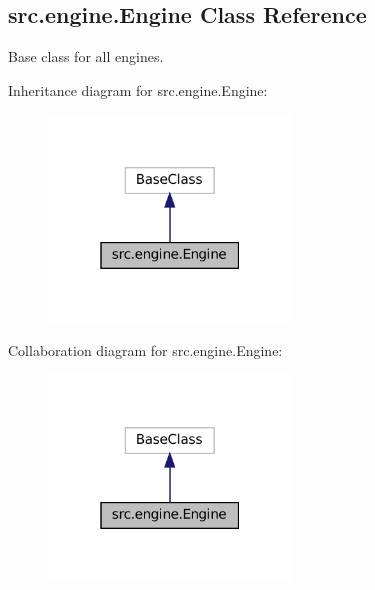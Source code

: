 \hypertarget{classsrc_1_1engine_1_1Engine}{}\subsection{src.\+engine.\+Engine Class Reference}
\label{classsrc_1_1engine_1_1Engine}


Base class for all engines.  




Inheritance diagram for src.\+engine.\+Engine\+:
\nopagebreak
\begin{figure}[H]
\begin{center}
\leavevmode
\includegraphics[width=183pt]{classsrc_1_1engine_1_1Engine__inherit__graph}
\end{center}
\end{figure}


Collaboration diagram for src.\+engine.\+Engine\+:
\nopagebreak
\begin{figure}[H]
\begin{center}
\leavevmode
\includegraphics[width=183pt]{classsrc_1_1engine_1_1Engine__coll__graph}
\end{center}
\end{figure}
